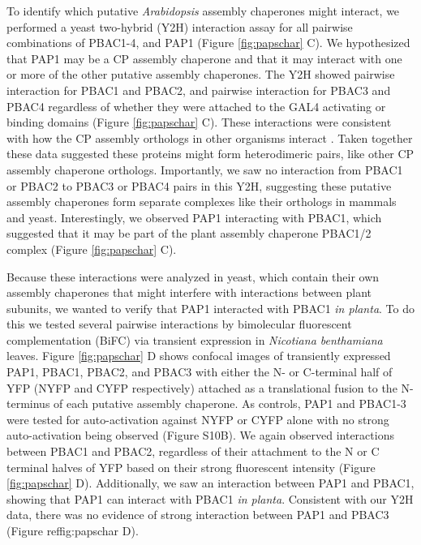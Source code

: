 To identify which putative \textit{Arabidopsis} assembly chaperones might interact, we performed a yeast two-hybrid (Y2H) interaction assay for all pairwise combinations of PBAC1-4, and PAP1 (Figure \ref{fig:papschar} C). We hypothesized that PAP1 may be a CP assembly chaperone and that it may interact with one or more of the other putative assembly chaperones. The Y2H showed pairwise interaction for PBAC1 and PBAC2, and pairwise interaction for PBAC3 and PBAC4 regardless of whether they were attached to the GAL4 activating or binding domains (Figure \ref{fig:papschar} C). These interactions were consistent with how the CP assembly orthologs in other organisms interact \citep{murata09}.  Taken together these data suggested these proteins might form heterodimeric pairs, like other CP assembly chaperone orthologs. Importantly, we saw no interaction from PBAC1 or PBAC2 to PBAC3 or PBAC4 pairs in this Y2H, suggesting these putative assembly chaperones form separate complexes like their orthologs in mammals and yeast. Interestingly, we observed PAP1 interacting with PBAC1, which suggested that it may be part of the plant assembly chaperone PBAC1/2 complex (Figure \ref{fig:papschar} C). 

Because these interactions were analyzed in yeast, which contain their own assembly chaperones that might interfere with interactions between plant subunits, we wanted to verify that PAP1 interacted with PBAC1 \textit{in planta}. To do this we tested several pairwise interactions by bimolecular fluorescent complementation (BiFC) via transient expression in \textit{Nicotiana benthamiana} leaves. Figure \ref {fig:papschar} D shows confocal images of transiently expressed PAP1, PBAC1, PBAC2, and PBAC3 with either the N- or C-terminal half of YFP (NYFP and CYFP respectively) attached as a translational fusion to the N-terminus of each putative assembly chaperone. As controls, PAP1 and PBAC1-3 were tested for auto-activation against NYFP or CYFP alone with no strong auto-activation being observed (Figure S10B). We again observed interactions between PBAC1 and PBAC2, regardless of their attachment to the N or C terminal halves of YFP based on their strong fluorescent intensity (Figure \ref{fig:papschar} D). Additionally, we saw an interaction between PAP1 and PBAC1, showing that PAP1 can interact with PBAC1 \textit{in planta}.  Consistent with our Y2H data, there was no evidence of strong interaction between PAP1 and PBAC3 (Figure ref{fig:papschar} D). 

\FloatBarrier

